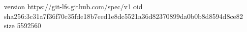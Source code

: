 version https://git-lfs.github.com/spec/v1
oid sha256:3c31a7f36f70c35fde18b7eed1e8dc5521a36d82370899da0b0b8d8594d8ce82
size 5592560
